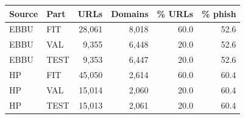 \begin{tabular}{llrrrr}
\toprule
Source & Part & URLs & Domains & \% URLs & \% phish \\
\midrule
EBBU & FIT & 28,061 & 8,018 & 60.0 & 52.6 \\
EBBU & VAL & 9,355 & 6,448 & 20.0 & 52.6 \\
EBBU & TEST & 9,353 & 6,447 & 20.0 & 52.6 \\
HP & FIT & 45,050 & 2,614 & 60.0 & 60.4 \\
HP & VAL & 15,014 & 2,060 & 20.0 & 60.4 \\
HP & TEST & 15,013 & 2,061 & 20.0 & 60.4 \\
\bottomrule
\end{tabular}

